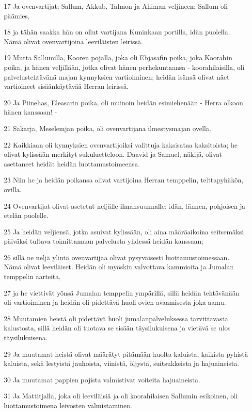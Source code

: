 \par 17 Ja ovenvartijat: Sallum, Akkub, Talmon ja Ahiman veljineen: Sallum oli päämies,
\par 18 ja tähän saakka hän on ollut vartijana Kuninkaan portilla, idän puolella. Nämä olivat ovenvartijoina leeviläisten leirissä.
\par 19 Mutta Sallumilla, Kooren pojalla, joka oli Ebjasafin poika, joka Koorahin poika, ja hänen veljillään, jotka olivat hänen perhekuntaansa - koorahilaisilla, oli palvelustehtävänä majan kynnyksien vartioiminen; heidän isänsä olivat näet vartioineet sisäänkäytävää Herran leirissä.
\par 20 Ja Piinehas, Eleasarin poika, oli muinoin heidän esimiehenään - Herra olkoon hänen kanssaan! -
\par 21 Sakarja, Meselemjan poika, oli ovenvartijana ilmestysmajan ovella.
\par 22 Kaikkiaan oli kynnyksien ovenvartijoiksi valittuja kaksisataa kaksitoista; he olivat kylissään merkityt sukuluetteloon. Daavid ja Samuel, näkijä, olivat asettaneet heidät heidän luottamustoimeensa.
\par 23 Niin he ja heidän poikansa olivat vartijoina Herran temppelin, telttapyhäkön, ovilla.
\par 24 Ovenvartijat olivat asetetut neljälle ilmansuunnalle: idän, lännen, pohjoisen ja etelän puolelle.
\par 25 Ja heidän veljiensä, jotka asuivat kylissään, oli aina määräaikoina seitsemäksi päiväksi tultava toimittamaan palvelusta yhdessä heidän kanssaan;
\par 26 sillä ne neljä ylintä ovenvartijaa olivat pysyväisesti luottamustoimessaan. Nämä olivat leeviläiset. Heidän oli myöskin valvottava kammioita ja Jumalan temppelin aarteita,
\par 27 ja he viettivät yönsä Jumalan temppelin ympärillä, sillä heidän tehtävänään oli vartioiminen ja heidän oli pidettävä huoli ovien avaamisesta joka aamu.
\par 28 Muutamien heistä oli pidettävä huoli jumalanpalveluksessa tarvittavasta kalustosta, sillä heidän oli tuotava se sisään täysilukuisena ja vietävä se ulos täysilukuisena.
\par 29 Ja muutamat heistä olivat määrätyt pitämään huolta kaluista, kaikista pyhistä kaluista, sekä lestyistä jauhoista, viinistä, öljystä, suitsukkeista ja hajuaineista.
\par 30 Ja muutamat pappien pojista valmistivat voiteita hajuaineista.
\par 31 Ja Mattitjalla, joka oli leeviläisiä ja oli koorahilaisen Sallumin esikoinen, oli luottamustoimena leivosten valmistaminen.
